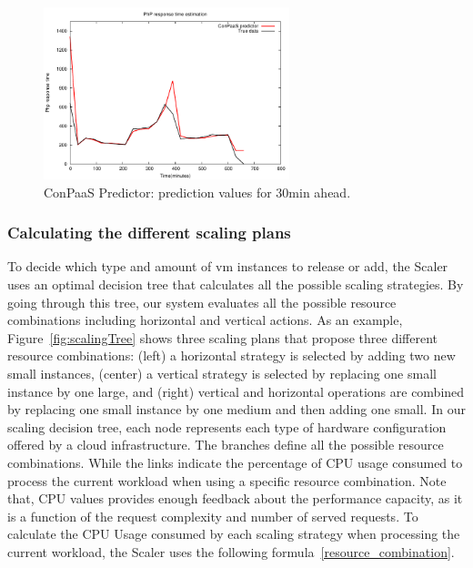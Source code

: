 \begin{figure}[htb]
  \begin{center}
    \includegraphics[height=5cm]{images/prediction_conpaas_30min}
  \end{center}
\vspace{-5mm}
  \caption{ConPaaS Predictor: prediction values for 30min ahead.}
  \label{fig:forecast}
\end{figure}

\subsubsection{Calculating the different scaling plans}
To decide which type and amount of vm instances to release or add, the Scaler uses an optimal decision tree that calculates all the possible scaling strategies. By going through this tree, our system evaluates all the possible resource combinations including horizontal and vertical actions. As an example, Figure~\ref{fig:scalingTree} shows three scaling plans that propose three different resource combinations: (left) a horizontal strategy is selected by adding two new small instances, (center) a vertical strategy is selected by replacing one small instance by one large, and (right) vertical and horizontal operations are combined by replacing one small instance by one medium and then adding one small. In our scaling decision tree, each node represents each type of hardware configuration offered by a cloud infrastructure. The branches define all the possible resource combinations. While the links indicate the percentage of CPU usage consumed to process the current workload when using a specific resource combination. Note that, CPU values provides enough feedback about the performance capacity, as it is a function of the request complexity  and number of served requests. To calculate the CPU Usage consumed by each scaling strategy when processing the current workload, the Scaler uses the following formula~\ref{resource_combination}. 


